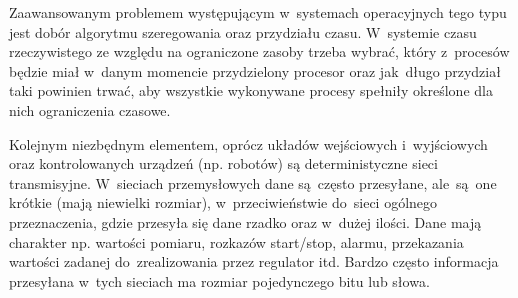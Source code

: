 Zaawansowanym problemem występującym w~systemach operacyjnych tego typu jest dobór algorytmu szeregowania oraz przydziału czasu. W~systemie czasu rzeczywistego ze względu na ograniczone zasoby trzeba wybrać, który z~procesów będzie miał w~danym momencie przydzielony procesor oraz jak~długo przydział taki powinien trwać, aby wszystkie wykonywane procesy spełniły określone dla nich ograniczenia czasowe.


Kolejnym niezbędnym elementem, oprócz układów wejściowych i~wyjściowych oraz kontrolowanych urządzeń (np. robotów) są deterministyczne sieci transmisyjne.
W~sieciach przemysłowych dane są~często przesyłane, ale~są~one krótkie (mają niewielki rozmiar), w~przeciwieństwie do~sieci ogólnego przeznaczenia, gdzie przesyła się dane rzadko oraz w~dużej ilości. Dane mają charakter np. wartości
pomiaru, rozkazów start/stop, alarmu, przekazania wartości zadanej do~zrealizowania przez regulator itd. Bardzo często informacja przesyłana w~tych sieciach ma rozmiar pojedynczego bitu lub słowa.

